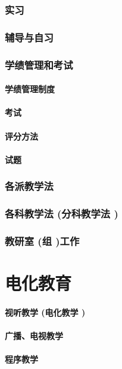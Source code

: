 \documentclass[UTF8]{../../ApplicationUniverse}
\begin{document}
    \subsection{实习}
    \subsection{辅导与自习}
    \subsection{学绩管理和考试}
        \subsubsection{学绩管理制度}
        \subsubsection{考试}
        \subsubsection{评分方法}
        \subsubsection{试题}
    \subsection{各派教学法}
    \subsection{各科教学法 (分科教学法 )}
    \subsection{教研室 (组 )工作}




\chapter{电化教育}
    \subsubsection{视听教学 (电化教学 )}
    \subsubsection{广播、电视教学}
    \subsubsection{程序教学}
\end{document}
